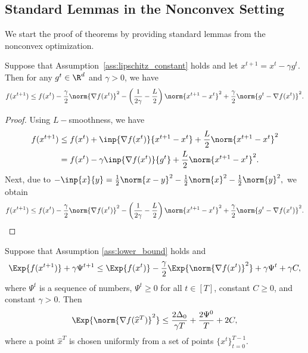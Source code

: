 \documentclass{article}
\begin{document}
\subsection{Standard Lemmas in the Nonconvex Setting}

We start the proof of theorems by providing standard lemmas from the nonconvex optimization.

\begin{lemma}
  \label{lemma:page_lemma}
  Suppose that Assumption~\ref{ass:lipschitz_constant} holds and let $x^{t+1} = x^{t} - \gamma g^{t}$. Then for any $g^{t} \in \R^d$ and $\gamma > 0$, we have
  \begin{eqnarray}
    \label{eq:page_lemma}
    f(x^{t + 1}) \leq f(x^t) - \frac{\gamma}{2}\norm{\nabla f(x^t)}^2 - \left(\frac{1}{2\gamma} - \frac{L}{2}\right)
    \norm{x^{t+1} - x^t}^2 + \frac{\gamma}{2}\norm{g^{t} - \nabla f(x^t)}^2.
  \end{eqnarray}
\end{lemma}

\begin{proof}
  Using $L-$smoothness, we have 
  \begin{align*}
    f(x^{t+1}) &\leq f(x^t) + \inp{\nabla f(x^t)}{x^{t+1} - x^{t}} + \frac{L}{2} \norm{x^{t+1} - x^{t}}^2 \\
    &= f(x^t) - \gamma \inp{\nabla f(x^t)}{g^t} + \frac{L}{2} \norm{x^{t+1} - x^{t}}^2.
  \end{align*}
  Next, due to $-\inp{x}{y} = \frac{1}{2}\norm{x - y}^2 - \frac{1}{2}\norm{x}^2 - \frac{1}{2}\norm{y}^2,$ we obtain 
  \begin{align*}
    f(x^{t+1}) \leq f(x^t) -\frac{\gamma}{2} \norm{\nabla f(x^t)}^2 - \left(\frac{1}{2\gamma} - \frac{L}{2}\right) \norm{x^{t+1} - x^{t}}^2 + \frac{\gamma}{2}\norm{g^t - \nabla f(x^t)}^2.
  \end{align*}
\end{proof}

\begin{lemma}
  \label{lemma:good_recursion}
  Suppose that Assumption \ref{ass:lower_bound} holds and
  \begin{align}
      \label{eq:private:good_recursion}
      \Exp{f(x^{t+1})} + \gamma \Psi^{t+1} \leq \Exp{f(x^t)} - \frac{\gamma}{2}\Exp{\norm{\nabla f(x^t)}^2} + \gamma \Psi^{t} + \gamma C,
  \end{align}
  where $\Psi^{t}$ is a sequence of numbers, $\Psi^{t} \geq 0$ for all $t \in [T]$, constant $C \geq 0$, and constant $\gamma > 0.$ Then 
  \begin{align}
      \label{eq:good_recursion}
      \Exp{\norm{\nabla f(\widehat{x}^T)}^2} \leq \frac{2 \Delta_0}{\gamma T} + \frac{2\Psi^{0}}{T} + 2 C,
  \end{align}
  where a point $\widehat{x}^T$ is chosen uniformly from a set of points $\{x^t\}_{t=0}^{T-1}.$
\end{lemma}
\end{document}
